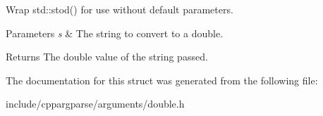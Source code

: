 Wrap std\+::stod() for use without default parameters. 


\begin{DoxyParams}{Parameters}
{\em s} & The string to convert to a double.\\
\hline
\end{DoxyParams}
\begin{DoxyReturn}{Returns}
The double value of the string passed. 
\end{DoxyReturn}


The documentation for this struct was generated from the following file\+:\begin{DoxyCompactItemize}
\item 
include/cppargparse/arguments/double.\+h\end{DoxyCompactItemize}
